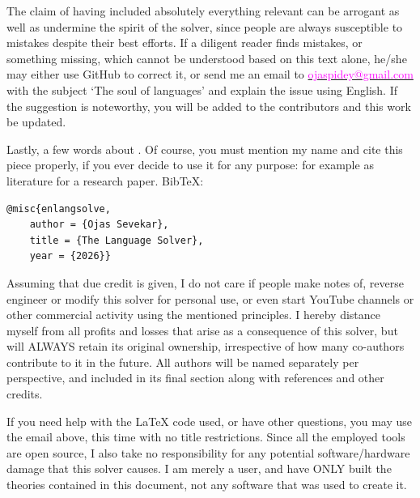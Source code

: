 The claim of having included absolutely everything relevant can be arrogant as well as undermine the spirit of the solver, since people are always susceptible to mistakes despite their best efforts. If a diligent reader finds mistakes, or something missing, which  cannot be understood based on this text alone, he/she may either use GitHub to correct it, or send me an email to \href{mailto:ojaspidey@gmail.com}{\textcolor{magenta}{ojaspidey@gmail.com}} with the subject `The soul of languages' and explain the issue using English.  If  the suggestion is noteworthy,  you will be added to the contributors and this work be updated.

 \label{copyright}
Lastly, a few words about \textcolor{magenta}{}. Of course, you must mention my name and cite  this piece properly, if you ever decide to use it for any purpose: for example as literature for a research paper.  BibTeX: 
\begin{setdef}
\begin{lstlisting}
@misc{enlangsolve,
    author = {Ojas Sevekar},
    title = {The Language Solver},
    year = {2026}}
\end{lstlisting}
\end{setdef}
Assuming that due credit is given, I do not care if people  make notes of, reverse engineer or modify this solver for personal use, or even start YouTube channels or other commercial activity using the mentioned principles. I hereby distance myself from all profits and losses that arise as a consequence of this solver, but will ALWAYS retain its original ownership, irrespective of how many co-authors contribute to it in the future. All authors will be named separately per perspective, and  included in its final section along with references and other credits.

 If you need help with the  \LaTeX{} code used, or have other questions, you may use the email above, this time with no title restrictions. Since all the employed tools are open source, I also take no responsibility for any potential software/hardware damage that this solver causes. I am merely a user, and have ONLY built the theories contained in this document, not any software that was used to create it.
